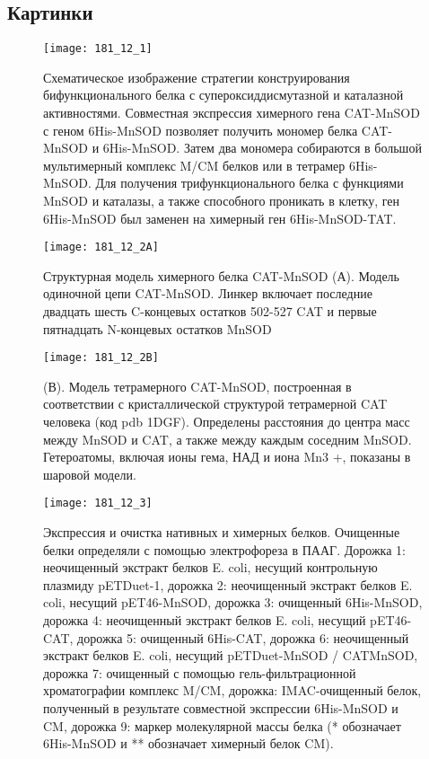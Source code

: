 \subsection{Картинки}

\begin{figure}[H]
	\centering
	\texttt{[image: 181\_12\_1]}
	\caption{Схематическое изображение стратегии конструирования бифункционального белка с супероксиддисмутазной и каталазной активностями. Совместная экспрессия химерного гена CAT-MnSOD с геном 6His-MnSOD позволяет получить мономер белка CAT-MnSOD и 6His-MnSOD. Затем два мономера собираются в большой мультимерный комплекс M/CM белков или в тетрамер 6His-MnSOD. Для получения трифункционального белка с функциями MnSOD и каталазы, а также способного проникать в клетку, ген 6His-MnSOD был заменен на химерный ген 6His-MnSOD-TAT.}
	\label{fig:181_12_1}
\end{figure}


\begin{figure}[H]
	\centering
	\texttt{[image: 181\_12\_2A]}
	\caption{Структурная модель химерного белка CAT-MnSOD (А). Модель одиночной цепи CAT-MnSOD. Линкер включает последние двадцать шесть C-концевых остатков 502-527 CAT и первые пятнадцать N-концевых остатков MnSOD}
	\label{fig:181_12_2A}	
\end{figure}


\begin{figure}[H]
	\centering
	\texttt{[image: 181\_12\_2B]}
	\caption{(В). Модель тетрамерного CAT-MnSOD, построенная в соответствии с кристаллической структурой тетрамерной CAT человека (код pdb 1DGF). Определены расстояния до центра масс между MnSOD и CAT, а также между каждым соседним MnSOD. Гетероатомы, включая ионы гема, НАД и иона Mn3 +, показаны в шаровой модели.}
	\label{fig:181_12_2B}		
\end{figure}


\begin{figure}[H]
	\centering
	\texttt{[image: 181\_12\_3]}
	\caption{Экспрессия и очистка нативных и химерных белков. Очищенные белки определяли с помощью электрофореза в ПААГ. Дорожка 1: неочищенный экстракт белков E. coli, несущий контрольную плазмиду pETDuet-1, дорожка 2: неочищенный экстракт белков E. coli, несущий pET46-MnSOD, дорожка 3: очищенный 6His-MnSOD, дорожка 4: неочищенный экстракт белков E. coli, несущий pET46-CAT, дорожка 5: очищенный 6His-CAT, дорожка 6: неочищенный экстракт белков E. coli, несущий pETDuet-MnSOD / CATMnSOD, дорожка 7: очищенный с помощью гель-фильтрационной хроматографии комплекс M/CM, дорожка: IMAC-очищенный белок, полученный в результате совместной экспрессии 6His-MnSOD и CM, дорожка 9: маркер молекулярной массы белка (* обозначает 6His-MnSOD и ** обозначает химерный белок CM).}
	\label{fig:181_12_3}		
\end{figure}

